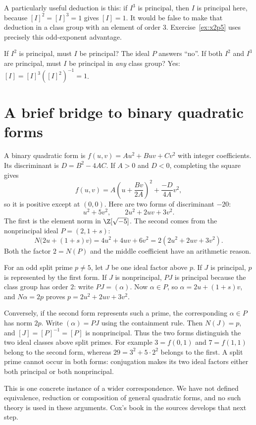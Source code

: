A particularly useful deduction is this: if $I^3$ is principal, then $I$ is
principal here, because $[I]^2=[I]^3=1$ gives $[I]=1$.
It would be false to make that deduction in a class group with an element of
order $3$. Exercise~\ref{ex:x2p5} uses precisely this odd-exponent advantage.

\begin{think}
If $I^2$ is principal, must $I$ be principal? The ideal $P$ answers ``no''.
If both $I^2$ and $I^3$ are principal, must $I$ be principal in \emph{any}
class group? Yes: $[I]=[I]^3([I]^2)^{-1}=1$.
\end{think}

\section{A brief bridge to binary quadratic forms}

A binary quadratic form is $f(u,v)=Au^2+Buv+Cv^2$ with integer
coefficients. Its discriminant is $D=B^2-4AC$.
If $A>0$ and $D<0$, completing the square gives
\[
f(u,v)=A\left(u+\frac{Bv}{2A}\right)^2
       +\frac{-D}{4A}v^2,
\]
so it is positive except at $(0,0)$.
Here are two forms of discriminant $-20$:
\[
u^2+5v^2,\qquad 2u^2+2uv+3v^2.
\]
The first is the element norm in $\Z[\sqrt{-5}]$.
The second comes from the nonprincipal ideal $P=(2,1+s)$:
\[
N\bigl(2u+(1+s)v\bigr)
=4u^2+4uv+6v^2=2(2u^2+2uv+3v^2).
\]
Both the factor $2=N(P)$ and the middle coefficient have an arithmetic reason.

For an odd split prime $p\ne5$, let $J$ be one ideal factor above $p$.
If $J$ is principal, $p$ is represented by the first form.
If $J$ is nonprincipal, $PJ$ is principal because the class group has
order $2$: write $PJ=(\alpha)$. Now $\alpha\in P$, so
$\alpha=2u+(1+s)v$, and $N\alpha=2p$ proves
$p=2u^2+2uv+3v^2$.

Conversely, if the second form represents such a prime, the corresponding
$\alpha\in P$ has norm $2p$. Write $(\alpha)=PJ$ using the containment
rule. Then $N(J)=p$, and $[J]=[P]^{-1}=[P]$ is nonprincipal.
Thus the two forms distinguish the two ideal classes above split primes.
For example $3=f(0,1)$ and $7=f(1,1)$ belong to the second form,
whereas $29=3^2+5\cdot2^2$ belongs to the first.
A split prime cannot occur in both forms: conjugation makes its two
ideal factors either both principal or both nonprincipal.

This is one concrete instance of a wider correspondence.
We have not defined equivalence, reduction or composition of general
quadratic forms, and no such theory is used in these arguments.
Cox's book in the sources develops that next step.


